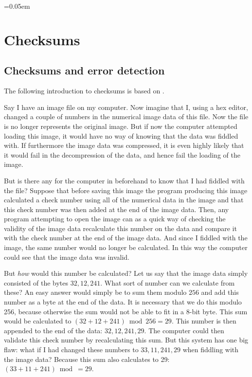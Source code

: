 \begin{comment}
  
\end{comment}

\begingroup
\arraycolsep=0.05em

\chapter{Checksums}
\label{cha:crc}

\section{Checksums and error detection}

The following introduction to checksums is based on
\cite{Williams_1993_crc_painless,barr:_addit_check,tanenbaum2003computernetworks_crc,Nelson:1992:FVU:135011.135017_crc32}.

Say I have an image file on my computer. Now imagine that I, using a
hex editor, changed a couple of numbers in the numerical image data of
this file. Now the file is no longer represents the original
image. But if now the computer attempted loading this image, it would
have no way of knowing that the data was fiddled with. If furthermore
the image data was compressed, it is even highly likely that it would
fail in the decompression of the data, and hence fail the loading of
the image.

But is there any for the computer in beforehand to know that I had
fiddled with the file? Suppose that before saving this image the
program producing this image calculated a check number using all of
the numerical data in the image and that this check number was then
added at the end of the image data. Then, any program attempting to
open the image can as a quick way of checking the validity of the
image data recalculate this number on the data and compare it with the
check number at the end of the image data. And since I fiddled with
the image, the same number would no longer be calculated. In this way
the computer could see that the image data was invalid.

But \textit{how} would this number be calculated? Let us say that the
image data simply consisted of the bytes $32,12,241$. What sort of
number can we calculate from these? An easy answer would simply be to
sum them modulo $256$ and add this number as a byte at the end of the
data. It is necessary that we do this modulo 256, because otherwise
the sum would not be able to fit in a 8-bit byte. This sum would be
calculated to $(32 + 12 + 241) \bmod 256 = 29$. This number is then
appended to the end of the data: $32,12,241,29$. The computer could
then validate this check number by recalculating this sum. But this
system has one big flaw: what if I had changed these numbers to
$33,11,241, 29$ when fiddling with the image data?  Because this sum
also calculates to 29: $(33 + 11 + 241) \bmod = 29$.


